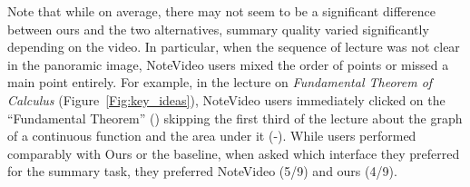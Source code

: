 Note that while on average, there may not seem to be a significant difference
between ours and the two alternatives, summary quality varied
significantly depending on the video. In particular, when the sequence of lecture was not clear in the panoramic image, NoteVideo users mixed the order of points or missed a main point entirely. For example, in the lecture on \textit{Fundamental Theorem of Calculus} (Figure~\ref{Fig:key_ideas}), NoteVideo users immediately clicked on the ``Fundamental Theorem'' () skipping the first third of the lecture about the graph of a continuous function and the area under it (-). While users performed comparably with Ours or the baseline, when asked which interface they preferred for the summary task, they preferred NoteVideo (5/9) and ours (4/9). 

